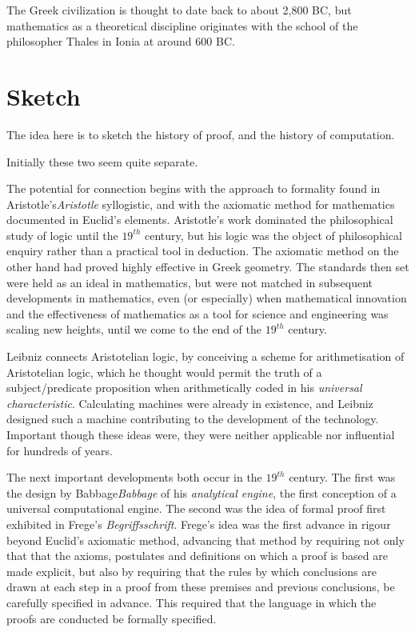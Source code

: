 The Greek civilization is thought to date back to about 2,800 BC, but
mathematics as a theoretical discipline originates with the school of
the philosopher Thales in Ionia at around 600 BC.

\section{Sketch}

The idea here is to sketch the history of proof, and the history of computation.

Initially these two seem quite separate.

The potential for connection begins with the approach to formality
found in Aristotle's\emph{Aristotle} syllogistic, and with the axiomatic method for
mathematics documented in Euclid's elements.
Aristotle's work dominated the philosophical study of logic until the
$19^{th}$ century, but his logic was the object of philosophical
enquiry rather than a practical tool in deduction.
The axiomatic method on the other hand had proved highly effective in
Greek geometry.
The standards then set were held as an ideal in mathematics, but were
not matched in subsequent developments in mathematics, even (or
especially) when mathematical innovation and the effectiveness of
mathematics as a tool for science and engineering was scaling new
heights, until we come to the end of the $19^{th}$ century.

Leibniz connects Aristotelian logic, by conceiving a scheme for
arithmetisation of Aristotelian logic, which he thought would permit
the truth of a subject/predicate proposition when arithmetically coded
in his \emph{universal characteristic}.
Calculating machines were already in existence, and Leibniz designed
such a machine contributing to the development of the technology.
Important though these ideas were, they were neither applicable nor
influential for hundreds of years.

The next important developments both occur in the $19^{th}$ century.
The first was the design by Babbage\emph{Babbage} of his
\emph{analytical engine}, the first
conception of a universal computational engine. 
The second was the idea of formal proof first exhibited in Frege's
\emph{Begriffsschrift}\cite{frege1879}.
Frege's idea was the first advance in rigour beyond Euclid's axiomatic
method, advancing that method by requiring not only that that the
axioms, postulates and definitions on which a proof is based are made
explicit, but also by requiring that the rules by which conclusions
are drawn at each step in a proof from these premises and previous
conclusions, be carefully specified in advance.
This required that the language in which the proofs are conducted be
formally specified.

